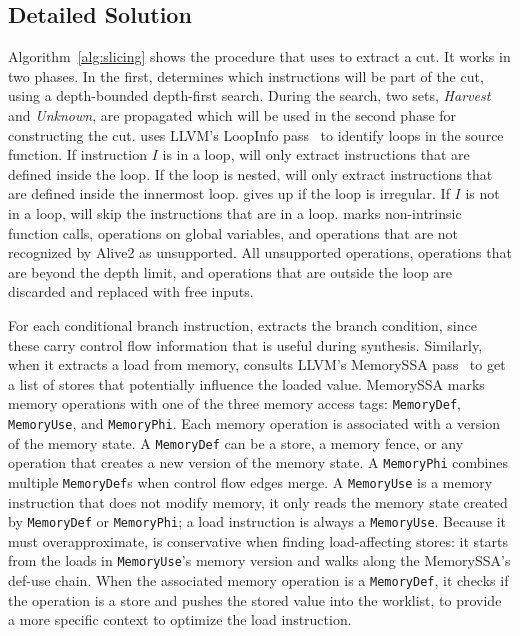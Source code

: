 \subsection{Detailed Solution}

Algorithm~\ref{alg:slicing} shows the procedure that \minotaur{} uses to
extract a cut.
%
It works in two phases.
%
In the first, \minotaur{} determines which instructions will be part
of the cut, using a depth-bounded depth-first search.
%
During the search, two sets, \emph{Harvest} and \emph{Unknown}, are
propagated which will be used in the second phase for constructing the
cut.
%
\minotaur{} uses LLVM's LoopInfo pass~\cite{loopinfo} to identify loops in the
source function.
%
If instruction $I$ is in a loop, \minotaur{} will only extract
instructions that are defined inside the loop.
If the loop is nested, \minotaur{} will only extract instructions that are
defined inside the innermost loop.
%
\minotaur{} gives up if the loop is irregular.
%
If $I$ is not in a loop, \minotaur{} will skip the instructions that are in a loop.
%
\minotaur{} marks non-intrinsic function calls, operations on global
variables, and operations that are not recognized by Alive2 as
unsupported.
%
All unsupported operations, operations that are beyond the depth
limit, and operations that are outside the loop are discarded and
replaced with free inputs.


For each conditional branch instruction, \minotaur{} extracts the branch
condition, since these carry control flow information that is useful
during synthesis.
%
Similarly, when it extracts a load from memory, \minotaur{} consults
LLVM's MemorySSA pass~\cite{MemorySSA} to get a list of stores that
potentially influence the loaded value.
%
MemorySSA marks memory operations with one of the three memory access tags:
\texttt{MemoryDef}, \texttt{MemoryUse}, and \texttt{MemoryPhi}.
Each memory operation is associated with a version of the memory state.
%
A \texttt{MemoryDef} can be a store, a memory fence, or any operation
that creates a new version of the memory state.
%
A \texttt{MemoryPhi} combines multiple \texttt{MemoryDef}s when
control flow edges merge.
%
A \texttt{MemoryUse} is a memory instruction that does not modify
memory, it only reads the memory state created by \texttt{MemoryDef}
or \texttt{MemoryPhi}; a load instruction is always a
\texttt{MemoryUse}.
%
Because it must overapproximate, \minotaur{} is conservative when finding
load-affecting stores: it starts from the loads
in \texttt{MemoryUse}'s memory version and walks along the MemorySSA's
def-use chain.
%
When the associated memory operation is a \texttt{MemoryDef}, it
checks if the operation is a store and pushes the stored value into
the worklist, to provide \minotaur{} a more specific context to optimize
the load instruction.


